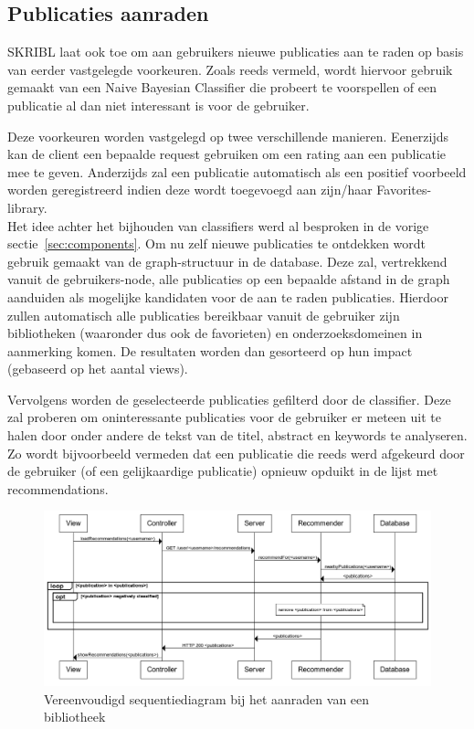 \documentclass{article}
\begin{document}
\subsection{Publicaties aanraden}

SKRIBL laat ook toe om aan gebruikers nieuwe publicaties aan te raden op basis van eerder vastgelegde voorkeuren. Zoals reeds vermeld, wordt hiervoor gebruik gemaakt van een Naive Bayesian Classifier die probeert te voorspellen of een publicatie al dan niet interessant is voor de gebruiker.

Deze voorkeuren worden vastgelegd op twee verschillende manieren. Eenerzijds kan de client een bepaalde request gebruiken om een rating aan een publicatie mee te geven. Anderzijds zal een publicatie automatisch als een positief voorbeeld worden geregistreerd indien deze wordt toegevoegd aan zijn/haar Favorites-library. \\

Het idee achter het bijhouden van classifiers werd al besproken in de vorige sectie~\ref{sec:components}. Om nu zelf nieuwe publicaties te ontdekken wordt gebruik gemaakt van de graph-structuur in de database. Deze zal, vertrekkend vanuit de gebruikers-node, alle publicaties op een bepaalde afstand in de graph aanduiden als mogelijke kandidaten voor de aan te raden publicaties. Hierdoor zullen automatisch alle publicaties bereikbaar vanuit de gebruiker zijn bibliotheken (waaronder dus ook de favorieten) en onderzoeksdomeinen in aanmerking komen. De resultaten worden dan gesorteerd op hun impact (gebaseerd op het aantal views).

Vervolgens worden de geselecteerde publicaties gefilterd door de classifier. Deze zal proberen om oninteressante publicaties voor de gebruiker er meteen uit te halen door onder andere de tekst van de titel, abstract en keywords te analyseren. Zo wordt bijvoorbeeld vermeden dat een publicatie die reeds werd afgekeurd door de gebruiker (of een gelijkaardige publicatie) opnieuw opduikt in de lijst met recommendations.

\begin{figure}[!h]
\centering
 \includegraphics[width=145mm]{recommendations.png}
 \caption{Vereenvoudigd sequentiediagram bij het aanraden van een bibliotheek}
 \label{recommendation-sequence}
\end{figure}
\end{document}
